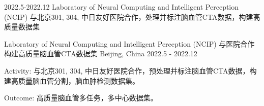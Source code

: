 \begin{cventries}
  2022.5-2022.12
  Laboratory of Neural Computing and Intelligent Perception (NCIP)
  与北京301, 304, 中日友好医院合作，处理并标注脑血管CTA数据，构建高质量数据集

  \cventry
  {Laboratory of Neural Computing and Intelligent Perception (NCIP)}
  {与医院合作构建高质量脑血管CTA数据集}
  {Beijing, China}
  {2022.5 - 2022.12}
  {
    \begin{cvitems}
      \item {Activity: 与北京301, 304, 中日友好医院合作，预处理并标注脑血管CTA数据，构建高质量脑血管分割，脑血肿检测数据集。}
      \item {Outcome: 高质量脑血管多任务，多中心数据集。}
    \end{cvitems}
  }
\end{cventries}
